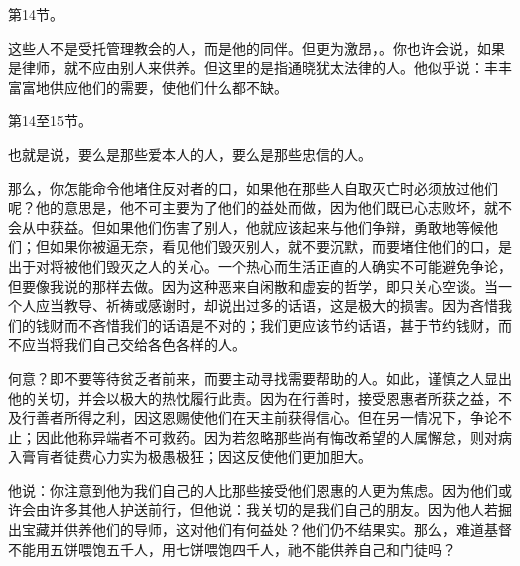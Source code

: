 第14节。\par

这些人不是受托管理教会的人，而是他的同伴。但更为激昂，。你也许会说，如果是律师，就不应由别人来供养。但这里的是指通晓犹太法律的人。他似乎说：丰丰富富地供应他们的需要，使他们什么都不缺。\par

第14至15节。\par

也就是说，要么是那些爱本人的人，要么是那些忠信的人。\par

\par

那么，你怎能命令他堵住反对者的口，如果他在那些人自取灭亡时必须放过他们呢？他的意思是，他不可主要为了他们的益处而做，因为他们既已心志败坏，就不会从中获益。但如果他们伤害了别人，他就应该起来与他们争辩，勇敢地等候他们；但如果你被逼无奈，看见他们毁灭别人，就不要沉默，而要堵住他们的口，是出于对将被他们毁灭之人的关心。一个热心而生活正直的人确实不可能避免争论，但要像我说的那样去做。因为这种恶来自闲散和虚妄的哲学，即只关心空谈。当一个人应当教导、祈祷或感谢时，却说出过多的话语，这是极大的损害。因为吝惜我们的钱财而不吝惜我们的话语是不对的；我们更应该节约话语，甚于节约钱财，而不应当将我们自己交给各色各样的人。\par

何意？即不要等待贫乏者前来，而要主动寻找需要帮助的人。如此，谨慎之人显出他的关切，并会以极大的热忱履行此责。因为在行善时，接受恩惠者所获之益，不及行善者所得之利，因这恩赐使他们在天主前获得信心。但在另一情况下，争论不止；因此他称异端者不可救药。因为若忽略那些尚有悔改希望的人属懈怠，则对病入膏肓者徒费心力实为极愚极狂；因这反使他们更加胆大。\par

他说：你注意到他为我们自己的人比那些接受他们恩惠的人更为焦虑。因为他们或许会由许多其他人护送前行，但他说：我关切的是我们自己的朋友。因为他人若掘出宝藏并供养他们的导师，这对他们有何益处？他们仍不结果实。那么，难道基督不能用五饼喂饱五千人，用七饼喂饱四千人，祂不能供养自己和门徒吗？\par

